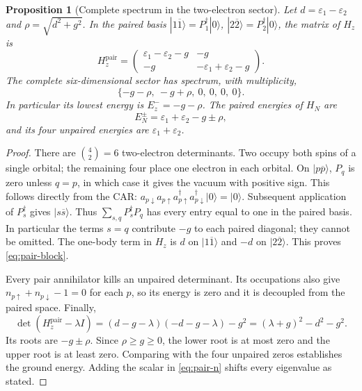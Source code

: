 \documentclass[11pt,a4paper]{article}
\theoremstyle{plain}
\newtheorem{proposition}[theorem]{Proposition}
\theoremstyle{definition}
\theoremstyle{remark}
\begin{document}
\begin{proposition}[Complete spectrum in the two-electron sector]
\label{prop:pairing}
Let $d=\varepsilon_1-\varepsilon_2$ and
$\rho=\sqrt{d^2+g^2}$. In the paired basis
$|1\overline1\rangle=P_1^\dagger|0\rangle$,
$|2\overline2\rangle=P_2^\dagger|0\rangle$, the matrix of $H_z$ is
\begin{equation}
 H_z^{\mathrm{pair}}=
 \begin{pmatrix}
 \varepsilon_1-\varepsilon_2-g&-g\\
 -g&-\varepsilon_1+\varepsilon_2-g
 \end{pmatrix}.
 \label{eq:pair-block}
\end{equation}
The complete six-dimensional sector has spectrum, with multiplicity,
\begin{equation}
 \{-g-\rho,\ -g+\rho,\ 0,\ 0,\ 0,\ 0\}.
 \label{eq:pair-spectrum}
\end{equation}
In particular its lowest energy is $E_z^-=-g-\rho$.
The paired energies of $H_N$ are
\begin{equation}
 E_N^\pm=\varepsilon_1+\varepsilon_2-g\pm\rho,
 \label{eq:number-roots}
\end{equation}
and its four unpaired energies are $\varepsilon_1+\varepsilon_2$.
\end{proposition}
\begin{proof}
There are $\binom42=6$ two-electron determinants. Two occupy both spins
of a single orbital; the remaining four place one electron in each orbital.
On $|p\overline p\rangle$, $P_q$ is zero unless $q=p$, in which case
it gives the vacuum with positive sign. This follows directly from the CAR:
$a_{p\downarrow}a_{p\uparrow}a_{p\uparrow}^\dagger
 a_{p\downarrow}^\dagger|0\rangle=|0\rangle$.
Subsequent application of $P_s^\dagger$ gives
$|s\overline s\rangle$. Thus $\sum_{s,q}P_s^\dagger P_q$ has every
entry equal to one in the paired basis. In particular the terms $s=q$
contribute $-g$ to each paired diagonal; they cannot be omitted.
The one-body term in $H_z$ is $d$ on $|1\overline1\rangle$ and
$-d$ on $|2\overline2\rangle$. This proves \eqref{eq:pair-block}.

Every pair annihilator kills an unpaired determinant. Its occupations also
give $n_{p\uparrow}+n_{p\downarrow}-1=0$ for each $p$, so its energy
is zero and it is decoupled from the paired space. Finally,
\[
 \det(H_z^{\mathrm{pair}}-\lambda I)
 =(d-g-\lambda)(-d-g-\lambda)-g^2
 =(\lambda+g)^2-d^2-g^2.
\]
Its roots are $-g\pm\rho$. Since $\rho\ge g\ge0$, the lower root
is at most zero and the upper root is at least zero. Comparing with the four
unpaired zeros establishes the ground energy. Adding the scalar in
\eqref{eq:pair-n} shifts every eigenvalue as stated.
\end{proof}
\end{document}
